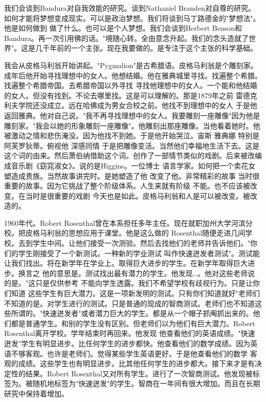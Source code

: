 我们会谈到Bandura对自我效能的研究。谈到Nathaniel Branden对自尊的研究。如何才能将梦想变成现实。可以是政治梦想。我们将谈到马丁路德金的"梦想法"。他是如何做到 做了什么。也可以是个人梦想。我们会谈到Herbert Benson和Bandura。再一次引用佛的话。"境随心转。全由意念升起。我们的念头造就了世界"。这是几千年前的一个主张。现在我要做的。是专注于这个主张的科学基础。 

我会从皮格马利翁开始讲起。"Pygmalion"是古希腊语。皮格马利翁是个雕刻家。成年后他开始寻找理想中的女人。他想结婚。他在雅典城里寻找。找遍整个希腊。找遍整个希腊帝国。去希腊帝国以外寻找 寻找他理想中的女人。一个能和他结婚的女人。但没有找到。不论去哪里找。这是可以理解的。那是1879年之前 雷德克利夫学院还没成立。远在哈佛成为男女合校之前。他找不到理想中的女人 于是他返回雅典。他对自己说。"我不再寻找理想中的女人。我要雕刻一座雕像"因为他是雕刻家。"我会以她的形象雕刻一座雕像"。他雕刻出那座雕像。当他看着她时。他被激动之情和悲伤淹没。因为他找不到她。于是他开始哭泣。宙斯 雅典娜 特别是阿芙罗狄蒂。俯视他 深感同情 于是把雕像变活。当然他们幸福地生活下去。这是这个词的由来。然后萧伯纳借助这个词。创作了一部情节类似的戏剧。后来被改编成音乐剧《窈窕淑女》。说的是Higgins。一位博士 语言学家。如何把一个卖花女塑造成贵族。当然故事讲完时。是她塑造了他 改变了他。非常精彩的故事 当时很重要的故事。因为它挑战了整个阶级体系。人生来就有阶级 不能。也不应该被改变。在当时是很重要的戏剧 今天也是如此。皮格马利翁和人是可以被改变。被改造的。 

1960年代。Robert Rosenthal曾在本系担任多年主任。现在就职加州大学河滨分校。把皮格马利翁的思想应用于课堂。他是这么做的 Rosenthal随便走进几间学校。去到学生中间。让他们接受一次测验。然后去找他们的老师并告诉他们。"你们的学生刚接受了一个新测试。一种新的学业测试 叫作快速迸发者测试"。测试能让我们找出。将在新学年在学业上。取得巨大进步的学生。在新学年取得巨大进步。换言之 他的意思是。测试找出最有潜力的学生。他发现…。他对这些老师说的是。"这只是仅供参考 不能向学生透露。我们不希望学校有歧视行为。只是让你们知道 这些学生有巨大潜力。这是一项新发明的测试。只有你们知道就好"老师们不知道的是。对学生进行的测试。只是普通的现成的智商测试。老师们也不知道这些所谓的。"快速迸发者"或者潜力巨大的学生。都是从一个帽子抓阄抓出来的。他们都是普通学生。和别的学生没有区别。但老师们以为他们有巨大潜力。Robert Rosenthal离开学校。学年结束时再回来。他发现 他查看他们的英语成绩。"快速迸发"学生有明显进步。比任何学生的进步都快。他查看他们的数学成绩。因为英语不够客观。也许是老师们。觉得某些学生英语更好。于是他查看他们的数学 客观的成绩。这些学生也有明显进步。比其他任何学生的进步都大。接下来才是有决定性的结果。Robert Rosenthal又对所有学生。进行了一次智商测试。他发现被标签为。被随机地标签为"快速迸发"的学生。智商在一年间有很大增加。而且在长期研究中保持着增加。 

